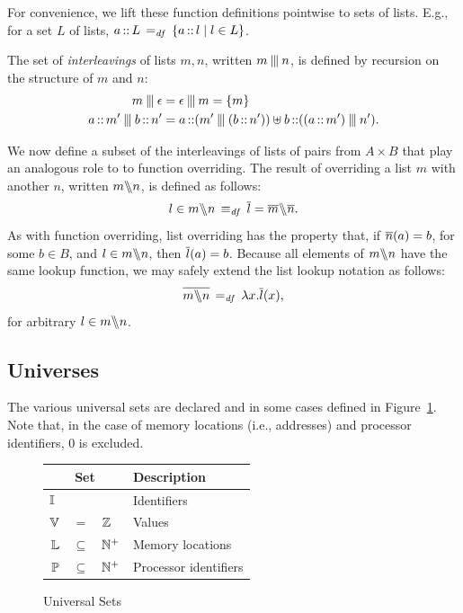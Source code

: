 \documentclass[11pt]{article}
\begin{document}
For convenience, we lift these function definitions pointwise to sets of lists. E.g., for a set $L$ of lists, $a \lcons L \eqdef \setof{a \lcons l}{l \in L}$. 

The set of \emph{interleavings} of lists $m,n$, written $m \merge n$, is defined by recursion on the structure of $m$ and $n$: \begin{align*}
	m \merge \lnil & = \lnil \merge m = \set{m} \\ 
	a \lcons m' \merge b \lcons n' & = a \lcons (m' \merge (b\lcons n')) \uplus b \lcons ((a \lcons m') \merge n').
\end{align*}

We now define a subset of the interleavings of lists of pairs from $A \times B$ that play an analogous role to to function overriding. The result of overriding a list $m$ with another $n$, written $m \override n$, is defined as follows: \[ l \in m \override n \iffdef \funof{l} = \funof{m} \override \funof{n}.\] As with function overriding, list overriding has the property that, if $\funof{n}(a) = b$, for some $b \in B$, and $l \in m \override n$, then $\funof{l}(a) = b$. Because all elements of $m \override n$ have the same lookup function, we may safely extend the list lookup notation as follows: \[ \funof{m \override n} \eqdef \lambda x . \funof{l}(x),\] for arbitrary $l \in m \override n$.

\subsection{Universes}

The various universal sets are declared and in some cases defined in Figure~\ref{fig:universes}. Note that, in the case of memory locations (i.e., addresses) and processor identifiers, 0 is excluded. 

\begin{figure}[ht]
	\centering
	\begin{tabular}{rcl|l}
		\multicolumn{3}{c}{Set} & Description \\ \hline
		\multicolumn{3}{l|}{$\setidentifiers$} & Identifiers \\
		$\setvalues$ & $=$ &  $\setintegers$ & Values \\
		$\setlocations$ & $\subseteq$  &  $\setpositives$ & Memory locations \\
		$\setprocessors$ &$\subseteq$ &  $\setpositives$ & Processor identifiers
	\end{tabular}
	\caption{\label{fig:universes}Universal Sets}
\end{figure}
\end{document}
